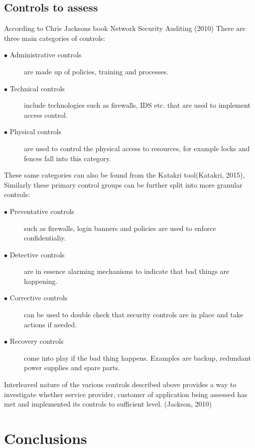 \documentclass{article}
\begin{document}
\subsection{Controls to assess}
According to Chris Jacksons book Network Security Auditing (2010) There are three main categories of controls:
\begin{description}
	\item[$\bullet$ Administrative controls] are made up of policies, training and processes.
	\item[$\bullet$ Technical controls] include technologies such as firewalls, IDS etc. that are used to implement access control.
	\item[$\bullet$ Physical controls] are used to control the physical access to resources, for example locks and fences fall into this category.
\end{description}
These same categories can also be found from the Katakri tool(Katakri, 2015), Similarly these primary control groups can be further split into more granular controls:
\begin{description}
	\item[$\bullet$ Preventative controls] such as firewalls, login banners and policies are used to enforce confidentialiy.
	\item[$\bullet$ Detective controls] are in essence alarming mechanisms to indicate that bad things are happening.
	\item[$\bullet$ Corrective controls] can be used to double check that security controls are in place and take actions if needed.
	\item[$\bullet$ Recovery controls] come into play if the bad thing happens. Examples are backup, redundant power supplies and spare parts.
\end{description}
Interleaved nature of the various controls described above provides a way to investigate whether service provider, customer of application being assessed has met and implemented its controls to sufficient level. (Jackson, 2010)

\section{Conclusions}
\end{document}
